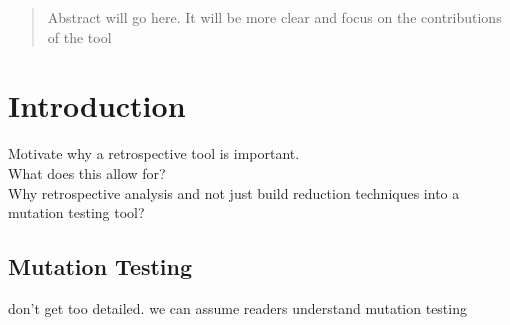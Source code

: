 \documentclass[conference]{IEEEtran}
\begin{document}
\vspace*{-1cm}
\begin{abstract}
    Abstract will go here. It will be more clear and focus on the contributions of the tool
\end{abstract}

%
\IEEEpeerreviewmaketitle

\section{Introduction}
Motivate why a retrospective tool is important. \\
What does this allow for?\\
Why retrospective analysis and not just build reduction techniques into a mutation testing tool?\\

\subsection{Mutation Testing}
don't get too detailed. we can assume readers understand mutation testing
\end{document}
